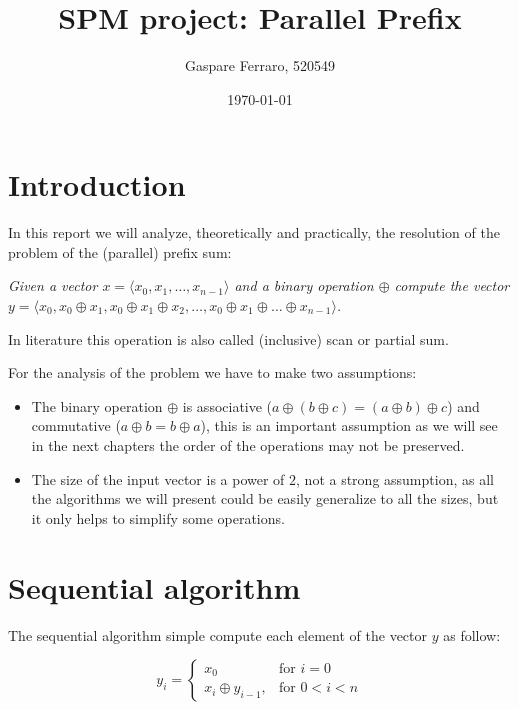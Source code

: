 \documentclass{article}
\title{SPM project: Parallel Prefix}
\author{Gaspare Ferraro, 520549}
\affil{Master Degree in Computer Science - University of Pisa}
\affil[]{ferraro@gaspa.re}
\date{\today}
\newcommand{\for}{\text{for }}
\begin{document}
 
\maketitle
 
\section{Introduction}

In this report we will analyze, theoretically and practically, the resolution of the problem of the (parallel) prefix sum:

\medskip

\textit{Given a vector $x = \langle x_{0}, x_{1}, \ldots, x_{n-1} \rangle$ and a binary operation $\oplus$ compute the vector $y = \langle x_{0}, x_{0} \oplus x_{1}, x_{0} \oplus x_{1} \oplus x_{2}, \ldots, x_{0} \oplus x_{1} \oplus \ldots \oplus x_{n-1} \rangle$.} %

\medskip

In literature this operation is also called (inclusive) scan or partial sum.

For the analysis of the problem we have to make two assumptions:

\begin{itemize}
  \item The binary operation $\oplus$ is associative ($ a \oplus ( b \oplus c ) =  (a \oplus b) \oplus c  $) and commutative ($a \oplus b = b \oplus a$), this is an important assumption as we will see in the next chapters the order of the operations may not be preserved.
  \item The size of the input vector is a power of $2$, not a strong assumption, as all the algorithms we will present could be easily generalize to all the sizes, but it only helps to simplify some operations.
\end{itemize}

\section{Sequential algorithm}

The sequential algorithm simple compute each element of the vector $y$ as follow:

\begin{equation*}[]
    y_{i} =
    \begin{cases}
      x_{0}& \for i = 0 \\
      x_{i} \oplus y_{i-1},& \for 0 <  i < n
    \end{cases}
\end{equation*}
\end{document}

